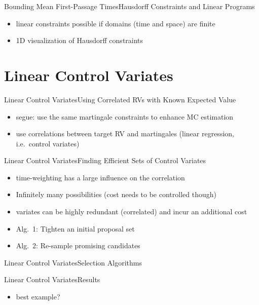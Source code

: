 \documentclass{beamer}
\begin{document}
\begin{frame}{Bounding Mean First-Passage Times}{Hausdorff Constraints and Linear Programs}
  \begin{itemize}
    \item linear constraints possible if domains (time and space) are finite
    \item 1D visualization of Hausdorff constraints
  \end{itemize}
\end{frame}

\section{Linear Control Variates}
\begin{frame}{Linear Control Variates}{Using Correlated RVs with Known Expected Value}
  \begin{itemize}
    \item segue: use the same martingale constraints to enhance MC estimation
    \item use correlations between target RV and martingales (linear regression, i.e.\ control variates)
  \end{itemize}
\end{frame}

\begin{frame}{Linear Control Variates}{Finding Efficient Sets of Control Variates}
  \begin{itemize}
    \item time-weighting has a large influence on the correlation
    \item Infinitely many possibilities (cost needs to be controlled though)
    \item variates can be highly redundant (correlated) and incur an additional cost
    \item Alg.~1: Tighten an initial proposal set
    \item Alg.~2: Re-sample promising candidates
  \end{itemize}
\end{frame}

\begin{frame}{Linear Control Variates}{Selection Algorithms}
\end{frame}

\begin{frame}{Linear Control Variates}{Results}
  \begin{itemize}
    \item best example?
  \end{itemize}
\end{frame}
\end{document}
